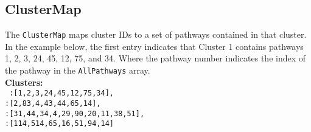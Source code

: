 \documentclass{article}
\begin{document}
			\subsection{ClusterMap}
			The \texttt{ClusterMap} maps cluster IDs to a set of pathways contained in that cluster. In the example below, the first entry indicates that Cluster 1 contains pathways 1, 2, 3, 24, 45, 12, 75, and 34. Where the pathway number indicates the index of the pathway in the \texttt{AllPathways} array.\\
			
			\noindent \textbf{Clusters:}\\
				\texttt{
					:[1,2,3,24,45,12,75,34],\\
					:[2,83,4,43,44,65,14],\\
					:[31,44,34,4,29,90,20,11,38,51],\\
					:[114,514,65,16,51,94,14]\\
				}
			
	
	
\end{document}

